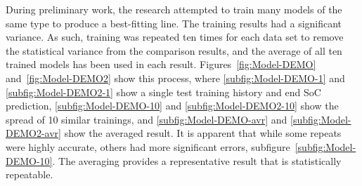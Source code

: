 %
During preliminary work, the research attempted to train many models of the same type to produce a best-fitting line.
The training results had a significant variance.
As such, training was repeated ten times for each data set to remove the statistical variance from the comparison results, and the average of all ten trained models has been used in each result.
Figures~\ref{fig:Model-DEMO} and~\ref{fig:Model-DEMO2} show this process, where \ref{subfig:Model-DEMO-1} and \ref{subfig:Model-DEMO2-1} show a single test training history and end SoC prediction, \ref{subfig:Model-DEMO-10} and \ref{subfig:Model-DEMO2-10} show the spread of 10 similar trainings, and \ref{subfig:Model-DEMO-avr} and \ref{subfig:Model-DEMO2-avr} show the averaged result.
It is apparent that while some repeats were highly accurate, others had more significant errors, subfigure~\ref{subfig:Model-DEMO-10}.
The averaging provides a representative result that is statistically repeatable.
